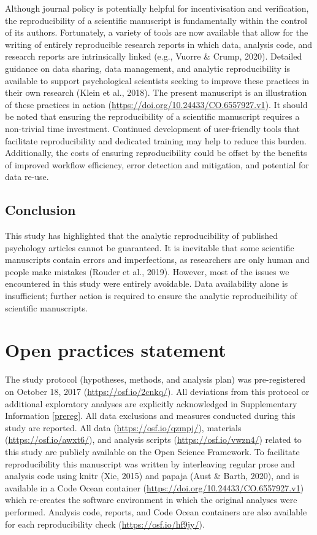 \documentclass[english,,man,floatsintext]{apa6}
\begin{document}
Although journal policy is potentially helpful for incentivisation and verification, the reproducibility of a scientific manuscript is fundamentally within the control of its authors. Fortunately, a variety of tools are now available that allow for the writing of entirely reproducible research reports in which data, analysis code, and research reports are intrinsically linked (e.g., Vuorre \& Crump, 2020). Detailed guidance on data sharing, data management, and analytic reproducibility is available to support psychological scientists seeking to improve these practices in their own research (Klein et al., 2018). The present manuscript is an illustration of these practices in action (\url{https://doi.org/10.24433/CO.6557927.v1}). It should be noted that ensuring the reproducibility of a scientific manuscript requires a non-trivial time investment. Continued development of user-friendly tools that facilitate reproducibility and dedicated training may help to reduce this burden. Additionally, the costs of ensuring reproducibility could be offset by the benefits of improved workflow efficiency, error detection and mitigation, and potential for data re-use.

\hypertarget{conclusion}{%
\subsection{Conclusion}\label{conclusion}}

This study has highlighted that the analytic reproducibility of published psychology articles cannot be guaranteed. It is inevitable that some scientific manuscripts contain errors and imperfections, as researchers are only human and people make mistakes (Rouder et al., 2019). However, most of the issues we encountered in this study were entirely avoidable. Data availability alone is insufficient; further action is required to ensure the analytic reproducibility of scientific manuscripts.

\hypertarget{open-practices-statement}{%
\section{Open practices statement}\label{open-practices-statement}}

The study protocol (hypotheses, methods, and analysis plan) was pre-registered on October 18, 2017 (\url{https://osf.io/2cnkq/}). All deviations from this protocol or additional exploratory analyses are explicitly acknowledged in Supplementary Information \ref{prereg}. All data exclusions and measures conducted during this study are reported. All data (\url{https://osf.io/qzmpj/}), materials (\url{https://osf.io/awxt6/}), and analysis scripts (\url{https://osf.io/vwzn4/}) related to this study are publicly available on the Open Science Framework. To facilitate reproducibility this manuscript was written by interleaving regular prose and analysis code using knitr (Xie, 2015) and papaja (Aust \& Barth, 2020), and is available in a Code Ocean container (\url{https://doi.org/10.24433/CO.6557927.v1}) which re-creates the software environment in which the original analyses were performed. Analysis code, reports, and Code Ocean containers are also available for each reproducibility check (\url{https://osf.io/hf9jy/}).
\end{document}
